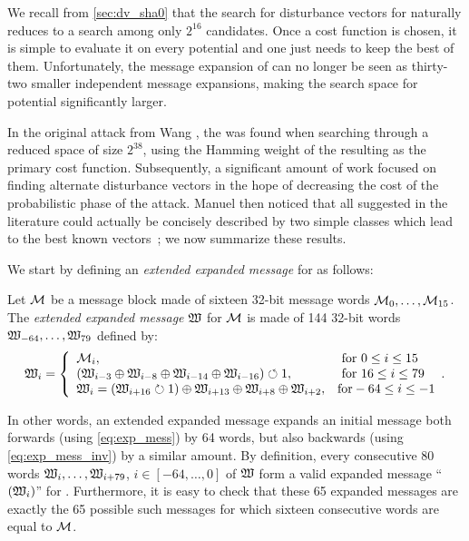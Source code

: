 We recall from \autoref{sec:dv_sha0} that the search for disturbance vectors for \shazero naturally reduces to a search among only $2^{16}$ candidates. Once a cost function
is chosen, it is simple to evaluate it on every potential \dv and one just needs to keep the best of them. Unfortunately, the message expansion of \shaone can no longer be seen as
thirty-two smaller independent message expansions, making the search space for potential \dvs significantly larger.

In the original attack from Wang \etal, the \dv was found when searching through a reduced space of size $2^{38}$, using the Hamming weight of the resulting \dvs
as the primary cost function.
Subsequently, a significant amount of work focused on finding alternate disturbance vectors in the hope of decreasing the cost of the
probabilistic phase of the attack. Manuel then noticed that all \dvs suggested in the literature could actually be concisely described by two simple classes which
lead to the best known vectors~\cite{DBLP:journals/dcc/Manuel11}; we now summarize these results.

\medskip

We start by defining an \emph{extended expanded message} for \shaone as follows:
\begin{defi}
\label{def:eem}
Let  $\mathcal{M}$  be a \shaone message block made of sixteen 32-bit message words $\mathcal{M}_0, \ldots, \mathcal{M}_{15}$. The \emph{extended expanded message} $\mathfrak{W}$ for $\mathcal{M}$
is made of 144 32-bit words $\mathfrak{W}_{-64}, \ldots, \mathfrak{W}_{79}$ defined by:
\begin{equation}
\label{eq:ext_exp_mess}
\mathfrak{W}_i=
\left\{
\begin{array}{ll}
\mathcal{M}_i, & \textnormal{ for } 0\leq i\leq 15 \\
(\mathfrak{W}_{i-3} \oplus \mathfrak{W}_{i-8} \oplus \mathfrak{W}_{i-14} \oplus \mathfrak{W}_{i-16}) \circlearrowleft 1, & \textnormal{ for } 16\leq i\leq 79\\
\mathfrak{W}_{i} = (\mathfrak{W}_{i+16} \circlearrowright 1) \oplus \mathfrak{W}_{i+13} \oplus \mathfrak{W}_{i+8} \oplus \mathfrak{W}_{i+2}, & \textnormal{for} -64\leq i\leq -1
\end{array}.
\right.
\end{equation}
\end{defi}
In other words, an extended expanded message expands an initial message both forwards (using \autoref{eq:exp_mess}) by 64 words, but also
backwards (using \autoref{eq:exp_mess_inv}) by a similar amount. By definition, every consecutive 80 words $\mathfrak{W}_i, \ldots, \mathfrak{W}_{i+79}$, $i \in [-64, \ldots, 0]$
of $\mathfrak{W}$ form a valid expanded message ``$(\mathfrak{W}_i)$'' for \shaone. Furthermore, it is easy to check that these 65 expanded messages are exactly the 65 possible such messages
for which sixteen consecutive words are equal to $\mathcal{M}$.

